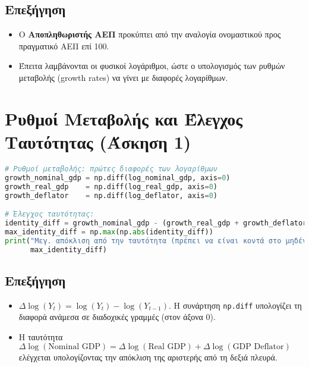 \documentclass{book}
\begin{document}
\subsection*{Επεξήγηση}
\begin{itemize}
  \item Ο \textbf{Αποπληθωριστής ΑΕΠ} προκύπτει από την αναλογία ονομαστικού προς πραγματικό ΑΕΠ επί 100.
  \item Έπειτα λαμβάνονται οι φυσικοί λογάριθμοι, ώστε ο υπολογισμός των ρυθμών μεταβολής (growth rates) να γίνει με διαφορές λογαρίθμων.
\end{itemize}

\section{Ρυθμοί Μεταβολής και Έλεγχος Ταυτότητας (Άσκηση 1)}
\begin{tcolorbox}[colback=white,colframe=black,title=Υπολογισμός Ρυθμών Μεταβολής και Επαλήθευση Ταυτότητας]
\begin{lstlisting}[language=Python]
# Ρυθμοί μεταβολής: πρώτες διαφορές των λογαρίθμων
growth_nominal_gdp = np.diff(log_nominal_gdp, axis=0)
growth_real_gdp    = np.diff(log_real_gdp, axis=0)
growth_deflator    = np.diff(log_deflator, axis=0)

# Έλεγχος ταυτότητας:
identity_diff = growth_nominal_gdp - (growth_real_gdp + growth_deflator)
max_identity_diff = np.max(np.abs(identity_diff))
print("Μεγ. απόκλιση από την ταυτότητα (πρέπει να είναι κοντά στο μηδέν):",
      max_identity_diff)
\end{lstlisting}
\end{tcolorbox}

\subsection*{Επεξήγηση}
\begin{itemize}
  \item \(\Delta \log(Y_t) = \log(Y_t) - \log(Y_{t-1})\). Η συνάρτηση \texttt{np.diff} υπολογίζει τη διαφορά ανάμεσα σε διαδοχικές γραμμές (στον άξονα 0).
  \item Η ταυτότητα \(\Delta \log(\text{Nominal GDP}) = \Delta \log(\text{Real GDP}) + \Delta \log(\text{GDP Deflator})\) ελέγχεται υπολογίζοντας την απόκλιση της αριστερής από τη δεξιά πλευρά.
\end{itemize}
\end{document}
